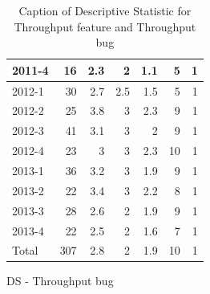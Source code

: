 \documentclass[UKenglish]{ifimaster}  %
\begin{document}
\begin{appendices}
\begin{table}[!htbp]
\begin{adjustwidth}{-1.5cm}{}
\begin{subfigure}[b]{0.3\textwidth}
{\begin{tabular}{ | l | r | r | r | r | r | r | }
 2011-4  & 16 & 2.3 & 2 & 1.1 & 5 & 1 \\ \hline
 2012-1  & 30 & 2.7 & 2.5 & 1.5 & 5 & 1 \\ \hline
 2012-2  & 25 & 3.8 & 3 & 2.3 & 9 & 1 \\ \hline
 2012-3  & 41 & 3.1 & 3 & 2 & 9 & 1 \\ \hline
 2012-4  & 23 & 3 & 3 & 2.3 & 10 & 1 \\ \hline
 2013-1  & 36 & 3.2 & 3 & 1.9 & 9 & 1 \\ \hline
 2013-2  & 22 & 3.4 & 3 & 2.2 & 8 & 1 \\ \hline
 2013-3  & 28 & 2.6 & 2 & 1.9 & 9 & 1 \\ \hline
 2013-4  & 22 & 2.5 & 2 & 1.6 & 7 & 1 \\ \hline
 Total  & 307 & 2.8 & 2 & 1.9 & 10 & 1 \\ \hline
\end{tabular}
}
\caption{DS - Throughput bug}
 \label{DS:TPB:9}
\end{subfigure}
\end{adjustwidth}
\caption[Optional caption for list of figures]{Caption of Descriptive Statistic for Throughput feature and Throughput bug}
\label{DS:9:2}
\end{table}




\end{appendices}
\end{document}
